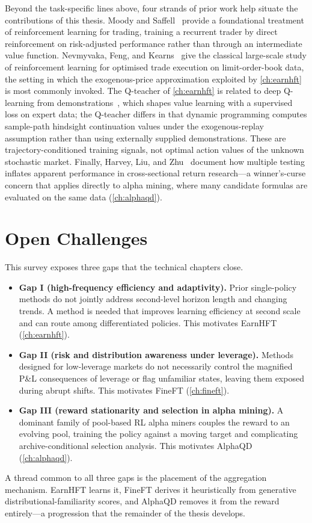 Beyond the task-specific lines above, four strands of prior work help situate the contributions of this thesis. Moody and Saffell~\cite{moody2001learning} provide a foundational treatment of reinforcement learning for trading, training a recurrent trader by direct reinforcement on risk-adjusted performance rather than through an intermediate value function. Nevmyvaka, Feng, and Kearns~\cite{nevmyvaka2006reinforcement} give the classical large-scale study of reinforcement learning for optimised trade execution on limit-order-book data, the setting in which the exogenous-price approximation exploited by \cref{ch:earnhft} is most commonly invoked. The Q-teacher of \cref{ch:earnhft} is related to deep Q-learning from demonstrations~\cite{hester2018dqfd}, which shapes value learning with a supervised loss on expert data; the Q-teacher differs in that dynamic programming computes sample-path hindsight continuation values under the exogenous-replay assumption rather than using externally supplied demonstrations. These are trajectory-conditioned training signals, not optimal action values of the unknown stochastic market. Finally, Harvey, Liu, and Zhu~\cite{harvey2016cross} document how multiple testing inflates apparent performance in cross-sectional return research---a winner's-curse concern that applies directly to alpha mining, where many candidate formulas are evaluated on the same data (\cref{ch:alphaqd}).

\section{Open Challenges}
\label{sec:bg_gaps}

This survey exposes three gaps that the technical chapters close.

\begin{itemize}
\item \textbf{Gap I (high-frequency efficiency and adaptivity).} Prior single-policy methods do not jointly address second-level horizon length and changing trends. A method is needed that improves learning efficiency at second scale and can route among differentiated policies. This motivates EarnHFT (\cref{ch:earnhft}).

\item \textbf{Gap II (risk and distribution awareness under leverage).} Methods designed for low-leverage markets do not necessarily control the magnified P\&L consequences of leverage or flag unfamiliar states, leaving them exposed during abrupt shifts. This motivates FineFT (\cref{ch:fineft}).

\item \textbf{Gap III (reward stationarity and selection in alpha mining).} A dominant family of pool-based RL alpha miners couples the reward to an evolving pool, training the policy against a moving target and complicating archive-conditional selection analysis. This motivates AlphaQD (\cref{ch:alphaqd}).
\end{itemize}

A thread common to all three gaps is the placement of the aggregation mechanism. EarnHFT learns it, FineFT derives it heuristically from generative distributional-familiarity scores, and AlphaQD removes it from the reward entirely---a progression that the remainder of the thesis develops.
